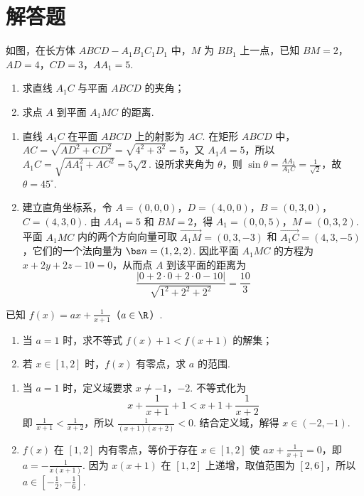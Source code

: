 \section{解答题}

\begin{problem}
如图，在长方体 \(ABCD-A_1B_1C_1D_1\) 中，\(M\) 为 \(BB_1\) 上一点，已知 \(BM=2\)，\(AD=4\)，\(CD=3\)，\(AA_1=5\).

\begin{enumerate}
\item 求直线 \(A_1C\) 与平面 \(ABCD\) 的夹角；
\item 求点 \(A\) 到平面 \(A_1MC\) 的距离.
\end{enumerate}

\FloatBarrier
\end{problem}

\begin{solution}
\begin{enumerate}
\item 直线 \(A_1C\) 在平面 \(ABCD\) 上的射影为 \(AC\). 在矩形 \(ABCD\) 中，\(AC=\sqrt{AD^2+CD^2}=\sqrt{4^2+3^2}=5\)，又 \(A_1A=5\)，所以 \(A_1C=\sqrt{AA_1^2+AC^2}=5\sqrt2\). 设所求夹角为 \(\theta\)，则 \(\sin\theta=\frac{AA_1}{A_1C}=\frac1{\sqrt2}\)，故 \(\theta=45^\circ\).
\item 建立直角坐标系，令 \(A=(0,0,0)\)，\(D=(4,0,0)\)，\(B=(0,3,0)\)，\(C=(4,3,0)\). 由 \(AA_1=5\) 和 \(BM=2\)，得 \(A_1=(0,0,5)\)，\(M=(0,3,2)\). 平面 \(A_1MC\) 内的两个方向向量可取 \(\overrightarrow{A_1M}=(0,3,-3)\) 和 \(\overrightarrow{A_1C}=(4,3,-5)\)，它们的一个法向量为 \(\bs n=(1,2,2)\). 因此平面 \(A_1MC\) 的方程为 \(x+2y+2z-10=0\)，从而点 \(A\) 到该平面的距离为
\[
\frac{|0+2\cdot0+2\cdot0-10|}{\sqrt{1^2+2^2+2^2}}=\frac{10}{3}
\]
\end{enumerate}
\end{solution}

\begin{problem}
已知 \(f(x)=ax+\frac1{x+1}\)（\(a\in\R\)）.

\begin{enumerate}
\item 当 \(a=1\) 时，求不等式 \(f(x)+1<f(x+1)\) 的解集；
\item 若 \(x\in[1,2]\) 时，\(f(x)\) 有零点，求 \(a\) 的范围.
\end{enumerate}
\end{problem}

\begin{solution}
\begin{enumerate}
\item 当 \(a=1\) 时，定义域要求 \(x\ne-1\)，\(-2\). 不等式化为
\[
x+\frac1{x+1}+1<x+1+\frac1{x+2}
\]
即 \(\frac1{x+1}<\frac1{x+2}\)，所以 \(\frac1{(x+1)(x+2)}<0\). 结合定义域，解得 \(x\in(-2,-1)\).
\item \(f(x)\) 在 \([1,2]\) 内有零点，等价于存在 \(x\in[1,2]\) 使 \(ax+\frac1{x+1}=0\)，即 \(a=-\frac1{x(x+1)}\). 因为 \(x(x+1)\) 在 \([1,2]\) 上递增，取值范围为 \([2,6]\)，所以 \(a\in\left[-\frac12,-\frac16\right]\).
\end{enumerate}
\end{solution}

